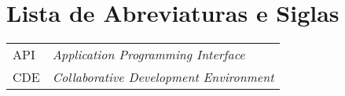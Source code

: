  
 \chapter*{Lista de Abreviaturas e Siglas} 
 
 \begin{tabular}{ll} 

API & \textit{Application Programming Interface} \\

CDE & \textit{Collaborative Development Environment } \\


\end{tabular} 
